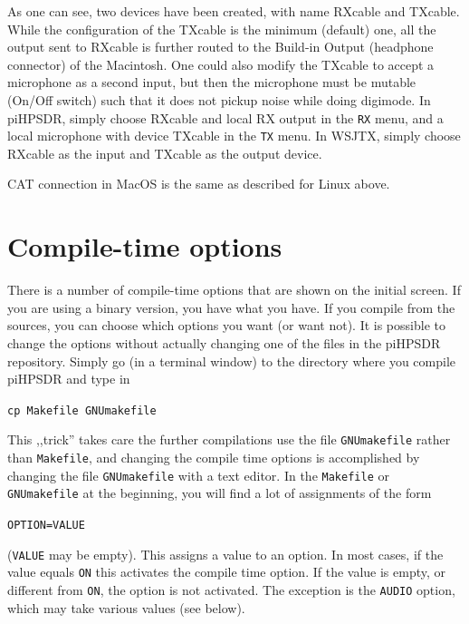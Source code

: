 \documentclass[12pt]{book}
\def\bltt#1{\texttt{\color{blue}#1}}
\def\grtt#1{\texttt{\color{magenta}#1}}
\begin{document}
As one can see, two devices have been created, with name RXcable and TXcable.
While the configuration of the TXcable is the minimum (default) one, all the
output sent to RXcable is further routed to the Build-in Output (headphone
connector) of the Macintosh. One could also modify the TXcable to accept a
microphone as a second input, but then the microphone must be mutable
(On/Off switch) such that it does not pickup noise while doing digimode.
In piHPSDR, simply choose RXcable and local RX output in the \bltt{RX} menu,
and a local microphone with device TXcable in the \bltt{TX} menu. In WSJTX,
simply choose RXcable as the input and TXcable as the output device.

CAT connection in MacOS is the same as described for Linux above.

\chapter{Compile-time options}
\label{sec:compiletime}

There is a number of compile-time options that are shown on the initial screen. If you are using a binary 
version, 
you have what you have. If you compile from the sources, you can choose which options you want (or want 
not).
It is possible to change the options without actually changing one of the files in the piHPSDR repository.
Simply go (in a terminal window) to the directory where you compile piHPSDR and type in

\grtt{cp Makefile GNUmakefile}

This ,,trick'' takes care the further compilations use the file \texttt{GNUmakefile} rather than 
\texttt{Makefile},
and changing the compile time options is accomplished by changing the file \texttt{GNUmakefile} with a text 
editor.
In the \texttt{Makefile} or \texttt{GNUmakefile} at the beginning, you will find a lot of assignments of the form

\texttt{OPTION=VALUE}

(\texttt{VALUE} may be empty). This assigns a value to an option. In most cases, if the value equals
\texttt{ON} this activates the compile time option. If the value is empty, or different from \texttt{ON},
the option is not activated. The exception is the \texttt{AUDIO} option, which may take various values
(see below).
\end{document}
